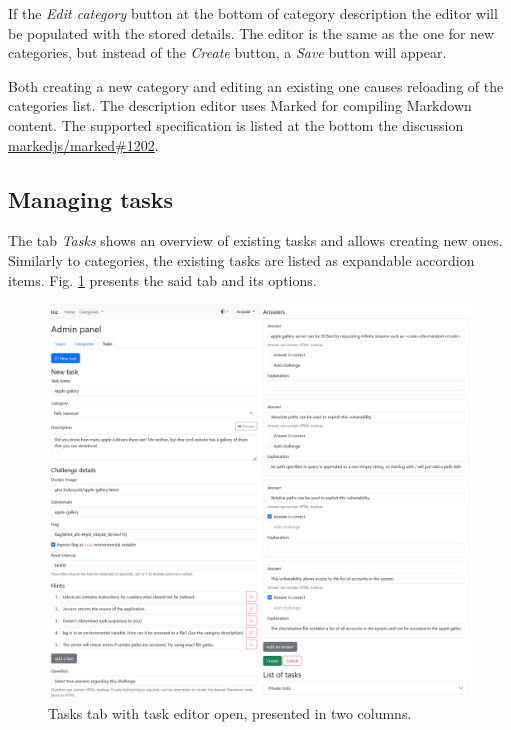 If the \textit{Edit category} button at the bottom of category description the editor will be populated with the stored details. The editor is the same as the one for new categories, but instead of the \textit{Create} button, a \textit{Save} button will appear.

Both creating a new category and editing an existing one causes reloading of the categories list. The description editor uses Marked for compiling Markdown content. The supported specification is listed at the bottom the discussion \href{https://github.com/markedjs/marked/discussions/1202}{markedjs/marked\#1202}.

\subsection{Managing tasks}
\label{ssec:managing-tasks}

The tab \textit{Tasks} shows an overview of existing tasks and allows creating new ones. Similarly to categories, the existing tasks are listed as expandable accordion items. Fig. \ref{fig:manual-admin-add-task} presents the said tab and its options.

\begin{figure}
    \centering
    \includegraphics[width=\textwidth]{img/manual-admin-add-task-2col.png}
    \caption{Tasks tab with task editor open, presented in two columns.}
    \label{fig:manual-admin-add-task}
\end{figure}

